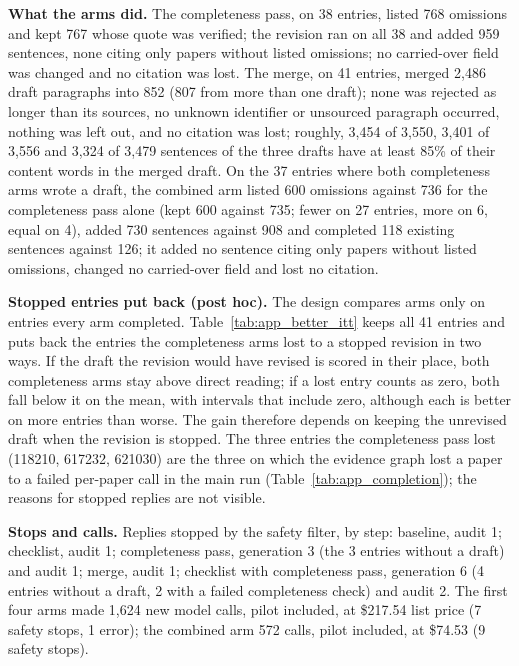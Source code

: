 \documentclass{article} %
\begin{document}
\textbf{What the arms did.} The completeness pass, on 38 entries, listed 768 omissions and kept 767 whose quote was verified; the revision ran on all 38 and added 959 sentences, none citing only papers without listed omissions; no carried-over field was changed and no citation was lost. The merge, on 41 entries, merged 2,486 draft paragraphs into 852 (807 from more than one draft); none was rejected as longer than its sources, no unknown identifier or unsourced paragraph occurred, nothing was left out, and no citation was lost; roughly, 3,454 of 3,550, 3,401 of 3,556 and 3,324 of 3,479 sentences of the three drafts have at least 85\% of their content words in the merged draft. On the 37 entries where both completeness arms wrote a draft, the combined arm listed 600 omissions against 736 for the completeness pass alone (kept 600 against 735; fewer on 27 entries, more on 6, equal on 4), added 730 sentences against 908 and completed 118 existing sentences against 126; it added no sentence citing only papers without listed omissions, changed no carried-over field and lost no citation.

\textbf{Stopped entries put back (post hoc).} The design compares arms only on entries every arm completed. Table~\ref{tab:app_better_itt} keeps all 41 entries and puts back the entries the completeness arms lost to a stopped revision in two ways. If the draft the revision would have revised is scored in their place, both completeness arms stay above direct reading; if a lost entry counts as zero, both fall below it on the mean, with intervals that include zero, although each is better on more entries than worse. The gain therefore depends on keeping the unrevised draft when the revision is stopped. The three entries the completeness pass lost (118210, 617232, 621030) are the three on which the evidence graph lost a paper to a failed per-paper call in the main run (Table~\ref{tab:app_completion}); the reasons for stopped replies are not visible.

\textbf{Stops and calls.} Replies stopped by the safety filter, by step: baseline, audit 1; checklist, audit 1; completeness pass, generation 3 (the 3 entries without a draft) and audit 1; merge, audit 1; checklist with completeness pass, generation 6 (4 entries without a draft, 2 with a failed completeness check) and audit 2. The first four arms made 1,624 new model calls, pilot included, at \$217.54 list price (7 safety stops, 1 error); the combined arm 572 calls, pilot included, at \$74.53 (9 safety stops).
\end{document}
